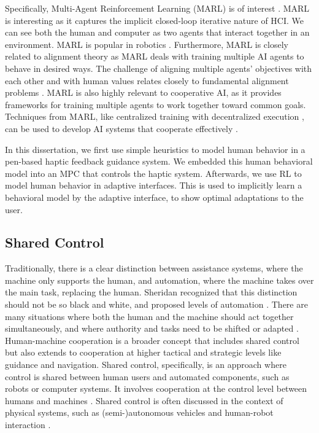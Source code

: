 Specifically, Multi-Agent Reinforcement Learning (MARL) is of interest \cite{debard2020multiagent}. MARL is interesting as it captures the implicit closed-loop iterative nature of HCI. We can see both the human and computer as two agents that interact together in an environment. MARL is popular in robotics \cite{yang2004multiagent}. Furthermore, MARL is closely related to alignment theory as MARL deals with training multiple AI agents to behave in desired ways. The challenge of aligning multiple agents' objectives with each other and with human values relates closely to fundamental alignment problems \cite{ma2022elign, rodriguez2022instilling}. MARL is also highly relevant to cooperative AI, as it provides frameworks for training multiple agents to work together toward common goals. Techniques from MARL, like centralized training with decentralized execution \cite{chen2019new}, can be used to develop AI systems that cooperate effectively \cite{tan1993multi}.

In this dissertation, we first use simple heuristics to model human behavior in a pen-based haptic feedback guidance system. We embedded this human behavioral model into an MPC that controls the haptic system. Afterwards, we use RL to model human behavior in adaptive interfaces. This is used to implicitly learn a behavioral model by the adaptive interface, to show optimal adaptations to the user.

\subsection{Shared Control}
Traditionally, there is a clear distinction between assistance systems, where the machine only supports the human, and automation, where the machine takes over the main task, replacing the human. Sheridan recognized that this distinction should not be so black and white, and proposed levels of automation \cite{sheridan1978human}. There are many situations where both the human and the machine should act together simultaneously, and where authority and tasks need to be shifted or adapted \cite{sheridan2011adaptive, miller2003beyond}.
Human-machine cooperation is a broader concept that includes shared control but also extends to cooperation at higher tactical and strategic levels like guidance and navigation. Shared control, specifically, is an approach where control is shared between human users and automated components, such as robots or computer systems. It involves cooperation at the control level between humans and machines \cite{flemisch2016shared}. Shared control is often discussed in the context of physical systems, such as (semi-)autonomous vehicles \cite{marcano2020review} and human-robot interaction \cite{losey2018review}.